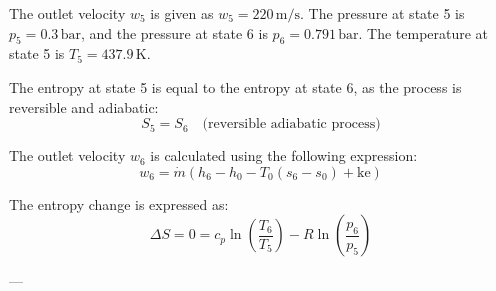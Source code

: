 The outlet velocity \( w_5 \) is given as \( w_5 = 220 \, \text{m/s} \).  
The pressure at state 5 is \( p_5 = 0.3 \, \text{bar} \), and the pressure at state 6 is \( p_6 = 0.791 \, \text{bar} \).  
The temperature at state 5 is \( T_5 = 437.9 \, \text{K} \).  

The entropy at state 5 is equal to the entropy at state 6, as the process is reversible and adiabatic:  
\[
S_5 = S_6 \quad \text{(reversible adiabatic process)}
\]

The outlet velocity \( w_6 \) is calculated using the following expression:  
\[
w_6 = \dot{m} \left( h_6 - h_0 - T_0 (s_6 - s_0) + \text{ke} \right)
\]

The entropy change is expressed as:  
\[
\Delta S = 0 = c_p \ln \left( \frac{T_6}{T_5} \right) - R \ln \left( \frac{p_6}{p_5} \right)
\]

---